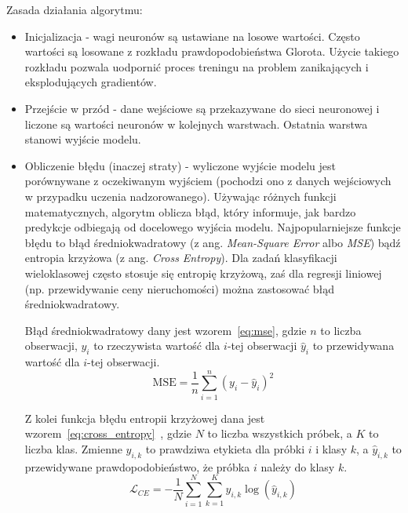 Zasada działania algorytmu:
\begin{itemize}
    \item Inicjalizacja - wagi neuronów są ustawiane na losowe wartości.
    Często wartości są losowane z rozkładu prawdopodobieństwa Glorota.
    Użycie takiego rozkładu pozwala uodpornić proces treningu na problem zanikających i eksplodujących gradientów.
    \item Przejście w przód - dane wejściowe są przekazywane do sieci neuronowej i liczone są wartości neuronów w kolejnych warstwach.
    Ostatnia warstwa stanowi wyjście modelu.
    \item Obliczenie błędu (inaczej straty) - wyliczone wyjście modelu jest porównywane z oczekiwanym wyjściem (pochodzi ono z danych wejściowych w przypadku uczenia nadzorowanego).
    Używając różnych funkcji matematycznych, algorytm oblicza błąd, który informuje, jak bardzo predykcje odbiegają od docelowego wyjścia modelu.
    Najpopularniejsze funkcje błędu to błąd średniokwadratowy (z ang. \textit{Mean-Square Error} albo \textit{MSE}) bądź entropia krzyżowa (z ang. \textit{Cross Entropy}).
    Dla zadań klasyfikacji wieloklasowej często stosuje się entropię krzyżową, zaś dla regresji liniowej (np.
    przewidywanie ceny nieruchomości) można zastosować błąd średniokwadratowy.

    Błąd średniokwadratowy dany jest wzorem~\ref{eq:mse}, gdzie $n$ to liczba obserwacji, $y_i$ to rzeczywista wartość dla $i$-tej obserwacji $\hat{y}_i$ to przewidywana wartość dla $i$-tej obserwacji.
    \begin{equation}
        \text{MSE} = \frac{1}{n} \sum_{i=1}^{n} (y_i - \hat{y}_i)^2\label{eq:mse}
    \end{equation}

    Z kolei funkcja błędu entropii krzyżowej dana jest wzorem~\ref{eq:cross_entropy}~\cite{crossentropy}, gdzie $N$ to liczba wszystkich próbek, a $K$ to liczba klas.
    Zmienne $y_{i,k}$ to prawdziwa etykieta dla próbki $i$ i klasy $k$, a $\hat{y}_{i,k}$ to przewidywane prawdopodobieństwo, że próbka $i$ należy do klasy $k$.
    \begin{equation}
        \mathcal{L}_{CE} = -\frac{1}{N} \sum_{i=1}^{N} \sum_{k=1}^{K} y_{i,k} \log(\hat{y}_{i,k})\label{eq:cross_entropy}
    \end{equation}


\end{itemize}
